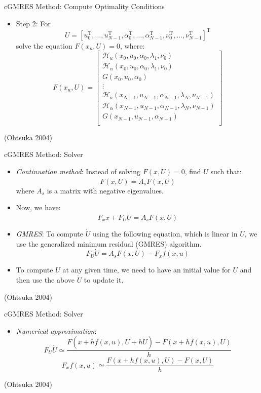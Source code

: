 \documentclass[]{beamer}
\providecommand{\tightlist}{%
  \setlength{\itemsep}{0pt}\setlength{\parskip}{0pt}}
\begin{document}
\begin{frame}{cGMRES Method: Compute Optimality Conditions}

\begin{itemize}
\tightlist
\item
  Step 2: For
  \[U=[u_0^\text{T},\ldots,u_{N-1}^\text{T},\alpha_0^\text{T},\ldots,\alpha_{N-1}^\text{T},\nu_0^\text{T},\ldots,\nu_{N-1}^\text{T}]^\text{T}\]
  solve the equation \(F(x_n, U)=0\), where: \[
  F(x_n, U)=\left[\begin{array}{c}
  \mathcal{H}_u(x_0,u_0,\alpha_0,\lambda_1,\nu_0)\\
  \mathcal{H}_\alpha(x_0,u_0,\alpha_0,\lambda_1,\nu_0)\\
  G(x_0,u_0,\alpha_0)\\
  \vdots\\
  \mathcal{H}_u(x_{N-1},u_{N-1},\alpha_{N-1},\lambda_N,\nu_{N-1})\\
  \mathcal{H}_\alpha(x_{N-1},u_{N-1},\alpha_{N-1},\lambda_N,\nu_{N-1})\\
  G(x_{N-1},u_{N-1},\alpha_{N-1})\\
  \end{array}\right]
  \]
\end{itemize}

(Ohtsuka 2004)

\end{frame}

\begin{frame}{cGMRES Method: Solver}

\begin{itemize}
\item
  \emph{Continuation method}: Instead of solving \(F(x, U)=0\), find
  \(U\) such that: \[\dot F(x, U)=A_sF(x, U)\] where \(A_s\) is a matrix
  with negative eigenvalues.
\item
  Now, we have: \[F_x\dot x+F_U\dot U=A_sF(x, U)\]
\item
  \emph{GMRES}: To compute \(\dot U\) using the following equation,
  which is linear in \(\dot U\), we use the generalized minimum residual
  (GMRES) algorithm. \[F_U\dot U=A_sF(x, U)-F_xf(x,u)\]
\item
  To compute \(U\) at any given time, we need to have an initial value
  for \(U\) and then use the above \(\dot U\) to update it.
\end{itemize}

(Ohtsuka 2004)

\end{frame}

\begin{frame}{cGMRES Method: Solver}

\begin{itemize}
\tightlist
\item
  \emph{Numerical approximation}:
  \[F_U\dot U\simeq \frac{F(x+hf(x,u),U+h\dot U)-F(x+hf(x,u),U)}{h}\]
  \[F_xf(x,u)\simeq\frac{F(x+hf(x,u),U)-F(x,U)}{h}\]
\end{itemize}

(Ohtsuka 2004)

\end{frame}
\end{document}
